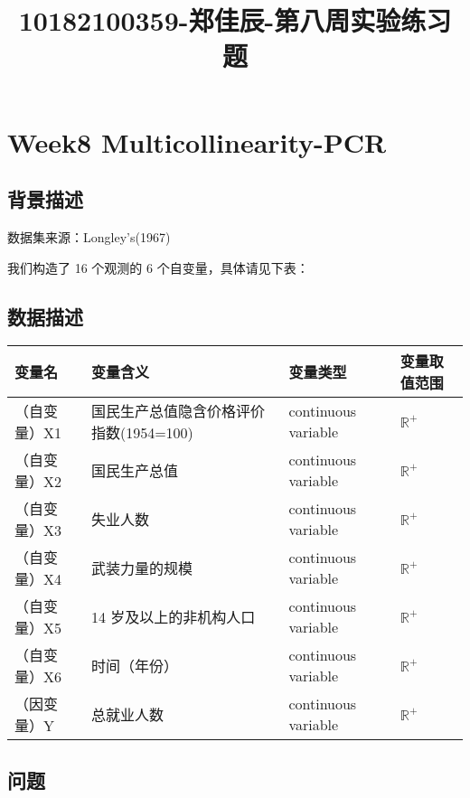 \documentclass[11pt]{ctexart}
\title{10182100359-郑佳辰-第八周实验练习题}
\begin{document}
    
    \maketitle
    
    

    
    \hypertarget{week8-multicollinearity-pcr}{%
\section{Week8
Multicollinearity-PCR}\label{week8-multicollinearity-pcr}}

\hypertarget{ux80ccux666fux63cfux8ff0}{%
\subsection{背景描述}\label{ux80ccux666fux63cfux8ff0}}

数据集来源：Longley's(1967)

我们构造了 16 个观测的 6 个自变量，具体请见下表：

\hypertarget{ux6570ux636eux63cfux8ff0}{%
\subsection{数据描述}\label{ux6570ux636eux63cfux8ff0}}

\begin{longtable}[]{llll}
\toprule
变量名 & 变量含义 & 变量类型 & 变量取值范围 \\
\midrule
\endhead
（自变量）X1 & 国民生产总值隐含价格评价指数(1954=100) & continuous
variable & \(\mathbb{R}^+\) \\
（自变量）X2 & 国民生产总值 & continuous variable & \(\mathbb{R}^+\) \\
（自变量）X3 & 失业人数 & continuous variable & \(\mathbb{R}^+\) \\
（自变量）X4 & 武装力量的规模 & continuous variable &
\(\mathbb{R}^+\) \\
（自变量）X5 & 14 岁及以上的非机构人口 & continuous variable &
\(\mathbb{R}^+\) \\
（自变量）X6 & 时间（年份） & continuous variable & \(\mathbb{R}^+\) \\
（因变量）Y & 总就业人数 & continuous variable & \(\mathbb{R}^+\) \\
\bottomrule
\end{longtable}

    \hypertarget{ux95eeux9898}{%
\subsection{问题}\label{ux95eeux9898}}
\end{document}
